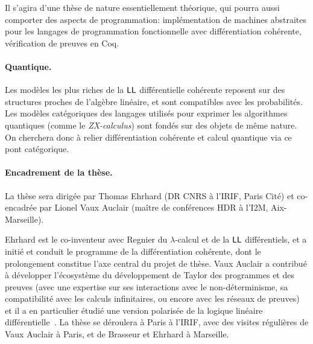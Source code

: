 \documentclass[a4]{article}
\begin{document}
Il s'agira d'une thèse de nature essentiellement théorique, qui pourra
aussi comporter des aspects de programmation: implémentation de
machines abstraites pour les langages de programmation fonctionnelle
avec différentiation cohérente, vérification de preuves en Coq.

\paragraph*{Quantique.}
Les modèles les plus riches de la $\hbox{\textsf{LL}}$ différentielle cohérente
reposent sur des structures proches de l'algèbre linéaire, et sont
compatibles avec les probabilités.
%
Les modèles catégoriques des langages utilisés pour exprimer
les algorithmes quantiques (comme le \emph{ZX-calculus}) sont fondés
sur des objets de même nature.
%
On cherchera donc à relier différentiation cohérente et calcul
quantique via ce pont catégorique.

\paragraph*{Encadrement de la thèse.}
La thèse sera dirigée par Thomas Ehrhard (DR CNRS à l’IRIF, Paris
Cité) et co-encadrée par Lionel Vaux Auclair (maître de conférences HDR à
l’I2M, Aix-Marseille).

Ehrhard est le co-inventeur avec Regnier du $\lambda$-calcul et de la $\hbox{\textsf{LL}}$
différentiels, et a initié et conduit le programme de la différentiation
cohérente, dont le prolongement constitue l’axe central du projet de thèse.
Vaux Auclair a contribué à développer l’écosystème du développement de Taylor
des programmes et des preuves (avec une expertise sur ses interactions avec le
non-déterminisme, sa compatibilité avec les calculs infinitaires, 
ou encore avec les réseaux de preuves) et il a en particulier étudié une
version polarisée de la logique linéaire diffé\-ren\-tielle~\cite{Vaux09a}.
%
La thèse se déroulera à Paris à l’IRIF, avec des visites régulières de Vaux
Auclair à Paris, et de Brasseur et Ehrhard à Marseille.



\end{document}
